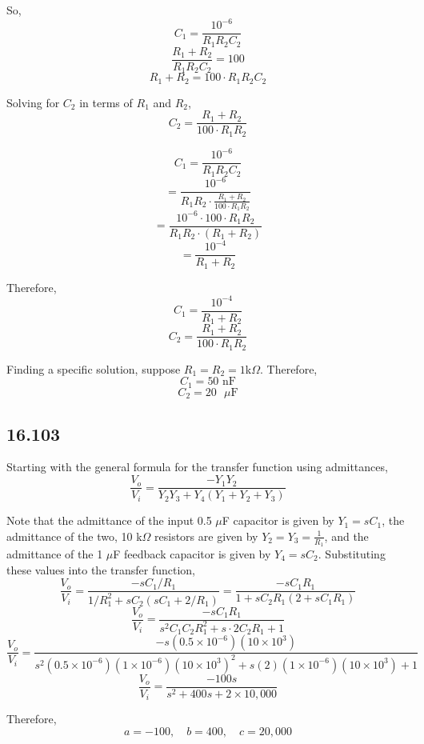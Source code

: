 \documentclass{article}
\begin{document}
\noindent So, 
$$C_1 = \frac{10^{-6}}{R_1 R_2 C_2}$$
$$\frac{R_1 + R_2}{R_1 R_2 C_2} = 100$$
$$R_1 + R_2 = 100 \cdot R_1 R_2 C_2$$

Solving for $C_2$ in terms of $R_1$ and $R_2$,
$$C_2 = \frac{R_1 + R_2}{100 \cdot R_1 R_2}$$

$$C_1 = \frac{10^{-6}}{R_1 R_2 C_2}$$
$$ = \frac{10^{-6}}{R_1 R_2 \cdot \frac{R_1 + R_2}{100 \cdot R_1 R_2}}$$
$$ = \frac{10^{-6} \cdot 100 \cdot R_1 R_2}{R_1 R_2 \cdot (R_1 + R_2)}$$
$$= \frac{10^{-4}}{R_1 + R_2}$$

Therefore,
$$C_1 = \frac{10^{-4}}{R_1 + R_2}$$
$$C_2 = \frac{R_1 + R_2}{100 \cdot R_1 R_2}$$

Finding a specific solution, suppose $R_1 = R_2 = 1 $k$\Omega$.
Therefore,
$$C_1 = 50 \text{ nF}$$
$$C_2 = 20 \text{ }\mu\text{F}$$



\subsection*{16.103}

Starting with the general formula for the transfer function using admittances,
\begin{equation*}
\frac{V_o}{V_i} = \frac{- Y_1Y_2}{Y_2Y_3 + Y_4 (Y_1 + Y_2 + Y_3)}
\end{equation*}

Note that the admittance of the input 0.5 $\mu$F capacitor is given by $Y_1 = sC_1$, 
the admittance of the two, 10 k$\Omega$ resistors are given by $Y_2 = Y_3 = \frac{1}{R_1}$, 
and the admittance of the 1 $\mu$F feedback capacitor is given by $Y_4 = sC_2$.
Substituting these values into the transfer function,
$$\frac{V_o}{V_i} = \frac{-sC_1/R_1}{1/R_1^2 + sC_2(sC_1 + 2/R_1)} = \frac{-sC_1R_1}{1 + sC_2R_1(2 + sC_1R_1)} $$
$$\frac{V_o}{V_i} = \frac{-sC_1R_1}{s^2C_1C_2R_1^2 + s \cdot 2C_2R_1 + 1} $$
$$\frac{V_o}{V_i} = \frac{-s(0.5 \times 10^{-6})(10 \times 10^3)}{s^2(0.5 \times 10^{-6})(1 \times 10^{-6})(10 \times 10^3)^2 + s(2)(1 \times 10^{-6})(10 \times 10^3) + 1} $$
$$\frac{V_o}{V_i} = \frac{-100s}{s^2 + 400s + 2 \times 10,000}$$

Therefore,
\begin{equation*}
a = -100, \quad b = 400, \quad c = 20,000
\end{equation*}
\end{document}
